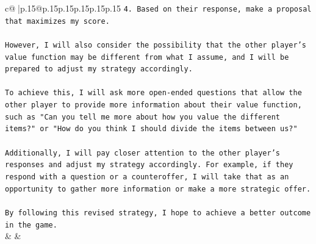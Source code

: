 \documentclass{article}
\begin{document}
{\begin{supertabular}{c@{$\;$}|p{.15\linewidth}@{}p{.15\linewidth}p{.15\linewidth}p{.15\linewidth}p{.15\linewidth}p{.15\linewidth}}
{{{\texttt{4. Based on their response, make a proposal that maximizes my score.} \\
\\ 
\texttt{However, I will also consider the possibility that the other player's value function may be different from what I assume, and I will be prepared to adjust my strategy accordingly.} \\
\\ 
\texttt{To achieve this, I will ask more open{-}ended questions that allow the other player to provide more information about their value function, such as "Can you tell me more about how you value the different items?" or "How do you think I should divide the items between us?"} \\
\\ 
\texttt{Additionally, I will pay closer attention to the other player's responses and adjust my strategy accordingly. For example, if they respond with a question or a counteroffer, I will take that as an opportunity to gather more information or make a more strategic offer.} \\
\\ 
\texttt{By following this revised strategy, I hope to achieve a better outcome in the game.} \\
            }
        }
    }
    & & \\ \\


\end{supertabular}}
\end{document}

